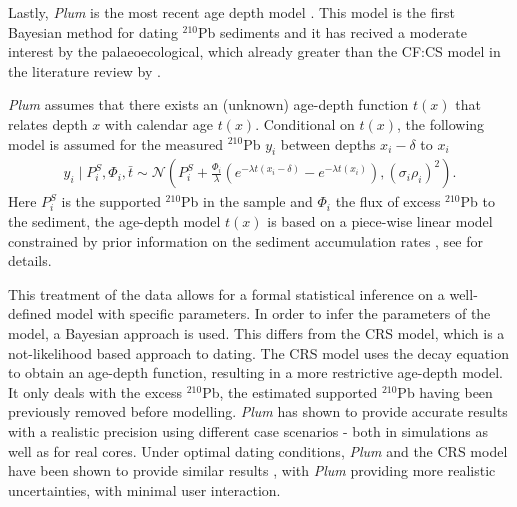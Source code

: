 \documentclass [10pt] {article}
\begin{document}
Lastly, \textit{Plum} is the most recent age depth model \citep{Aquino2018}.
This model is the first Bayesian method for dating $^{210}$Pb sediments and it has recived a moderate interest by the palaeoecological, which already greater than the CF:CS model in the literature review by \citet{Courtney2019}.

\textit{Plum} assumes that there exists an (unknown) age-depth function $t(x)$ that relates depth $x$ with calendar age $t(x)$. 
Conditional on $t(x)$, the following model is assumed for the measured $^{210}$Pb $y_i$ between depths $x_i - \delta$ to $x_i$
\begin{eqnarray}
y_i\mid P^S_i, \Phi_i, \bar{t}\sim \mathcal{N} \left(P^S_i+\frac{\Phi_i}{\lambda} \left( e^{-\lambda t(x_i-\delta)} - e^{-\lambda t(x_i)} \right), (\sigma_i\rho_i)^2 \right). 
\end{eqnarray}
Here $P_i^S$ is the supported $^{210}$Pb in the sample and $\Phi_i$ the flux of excess $^{210}$Pb to the sediment, the age-depth model $t(x)$ is based on a piece-wise linear model constrained by prior information on the sediment accumulation rates  \citep{Blaauw2011}, see \citep{Aquino2018} for details.

This treatment of the data allows for a formal statistical inference on a well-defined model with specific parameters. 
In order to infer the parameters of the model, a Bayesian approach is used.
This differs from the CRS model, which is a not-likelihood based approach to dating.
The CRS model uses the decay equation to obtain an age-depth function, resulting in a more restrictive age-depth model. 
It only deals with the excess $^{210}$Pb, the estimated supported $^{210}$Pb having been previously removed before modelling.
\textit{Plum} has shown to provide accurate results with a realistic precision using different case scenarios \citep{Aquino2018,Aquino2020} - both in simulations as well as for real cores.
Under optimal dating conditions, \textit{Plum} and the CRS model have been shown to provide similar results \citep{Aquino2020}, with \textit{Plum} providing more realistic uncertainties, with minimal user interaction.
\end{document}
